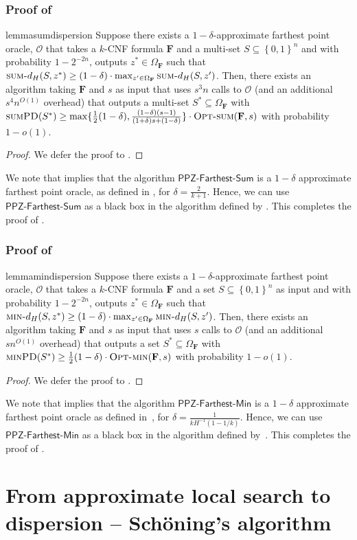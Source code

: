 \documentclass[11pt, letterpaper]{article}
\theoremstyle{definition}
\newcommand{\set}[1]{\left \{ #1 \right \}}
\newcommand{\f}{\mathbf{F}}
\newcommand{\Om}{\Omega_{\f}}
\newcommand{\PD}{\textsc{minPD}}
\newcommand{\SPD}{\textsc{sumPD}}
\newcommand{\sumd}{\textsc{sum-}d_H}
\newcommand{\mind}{\textsc{min-}d_H}
\newcommand{\opts}{\textsc{Opt-sum}}
\newcommand{\optm}{\textsc{Opt-min}}
\newcommand{\sch}{Sch\"{o}ning\xspace}
\begin{document}
 \subsubsection*{Proof of }
\begin{restatable}{lemma}{sumdispersion} \label{lem:sumdispersion}
    Suppose there exists a $1-\delta$-approximate farthest point oracle, $\mathcal{O}$ that takes a $k$-CNF formula $\f$ and a multi-set $S \subseteq \set{0,1}^n$ and with probability $1-2^{-2n}$, outputs $z^* \in \Om$ such that $\sumd(S, z^*) \geq (1-\delta) \cdot \max_{z' \in \Om} \sumd(S, z')$. Then, there exists an algorithm taking $\f$ and $s$ as input that uses $s^3 n$ calls to $\mathcal{O}$ (and an additional $s^4 n^{O(1)}$ overhead) that outputs a multi-set $S^* \subseteq \Om$ with $\SPD(S^*) \geq \max \{\frac{1}{2}(1-\delta) ,\frac{(1-\delta)(s-1)}{(1+\delta)s+(1-\delta)} \}\cdot \opts(\f,s)$ with probability $1-o(1)$.
\end{restatable}
\begin{proof}
    We defer the proof to . 
\end{proof}

We note that  implies that the algorithm $\textsf{PPZ-Farthest-Sum}$ is a $1-\delta$ approximate farthest point oracle, as defined in , for $\delta=\frac{2}{k+1}$. Hence, we can use $\textsf{PPZ-Farthest-Sum}$ as a black box in the algorithm defined by . This completes the proof of .
\subsubsection*{Proof of } 
\begin{restatable}{lemma}{mindispersion}
\label{lem:mindispersion}
    Suppose there exists a $1-\delta$-approximate farthest point oracle, $\mathcal{O}$ that takes a $k$-CNF formula $\f$ and a set $S \subseteq \set{0,1}^n$ as input and with probability $1-2^{-2n}$, outputs $z^* \in \Om$ such that $\mind(S, z^*) \geq (1-\delta) \cdot \max_{z' \in \Om} \mind(S, z')$. Then, there exists an algorithm taking $\f$ and $s$ as input that uses $s$ calls to $\mathcal{O}$ (and an additional $sn^{O(1)}$ overhead) that outputs a set $S^* \subseteq \Om$ with $\PD(S^*) \geq \frac{1}{2} (1-\delta)\cdot \optm(\f,s)$ with probability $1-o(1)$.
\end{restatable}
\begin{proof}
    We defer the proof to .
\end{proof}
We note that  implies that the algorithm $\textsf{PPZ-Farthest-Min}$ is a $1-\delta$ approximate farthest point oracle as defined in~, for $\delta=\frac{1}{k H^{-1}(1-1/k)}$. Hence, we can use $\textsf{PPZ-Farthest-Min}$ as a black box in the algorithm defined by~. This completes the proof of .  \section{From approximate local search to dispersion -- \sch's algorithm}\label{sec:sch}
\end{document}
